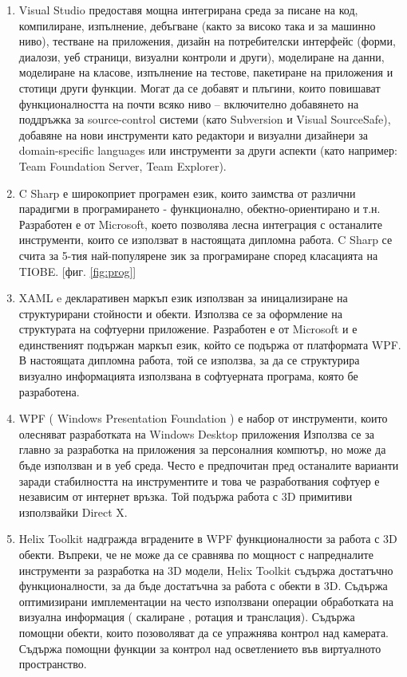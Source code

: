 \begin{enumerate}
    \item Visual Studio предоставя мощна интегрирана среда за писане на код, компилиране, изпълнение, дебъгване (както за високо така и за машинно ниво), тестване на приложения, дизайн на потребителски интерфейс (форми, диалози, уеб страници, визуални контроли и други), моделиране на данни, моделиране на класове, изпълнение на тестове, пакетиране на приложения и стотици други функции. Могат да се добавят и плъгини, които повишават функционалността на почти всяко ниво – включително добавянето на поддръжка за source-control системи (като Subversion и Visual SourceSafe), добавяне на нови инструменти като редактори и визуални дизайнери за domain-specific languages или инструменти за други аспекти (като например: Team Foundation Server, Team Explorer). \cite{vs}
    
    \item C Sharp е широкоприет програмен език, които заимства от различни парадигми в програмирането - функционално, обектно-ориентирано и т.н. Разработен е от Microsoft, което позволява лесна интеграция с останалите инструменти, които се използват в настоящата дипломна работа. C Sharp се счита за 5-тия най-популярене зик за програмиране според класацията на TIOBE. [фиг. \ref{fig:prog}]
    
    \item XAML e декларативен маркъп език използван за иницализиране на структурирани стойности и обекти. Използва се за оформление на структурата на софтуерни приложение. Разработен е от Microsoft и е единственият подържан маркъп език, който се подържа от платформата WPF. В настоящата дипломна работа, той се използва, за да се структурира визуално информацията използвана в софтуерната програма, която бе разработена.
    
    \item WPF ( Windows Presentation Foundation ) \cite{wpf} е набор от инструменти, които олесняват разработката на Windows Desktop приложения Използва се за главно за разработка на приложения за персоналния компютър, но може да бъде използван и в уеб среда. Често е предпочитан пред останалите варианти заради стабилността на инструментите и това че разработвания софтуер е независим от интернет връзка. Той подържа работа с 3D примитиви използвайки Direct X. \cite{wpfUsage}
    
    \item Helix Toolkit надгражда вградените в WPF функционалности за работа с 3D обекти. Въпреки, че не може да се сравнява по мощност с напредналите инструменти за разработка на 3D модели, Helix Toolkit съдържа достатъчно функционалности, за да бъде достатъчна за работа с обекти в 3D. Съдържа оптимизирани имплементации на често използвани операции обработката на визуална информация ( скалиране , ротация и транслация). Съдържа помощни обекти, които позоволяват да се упражнява контрол над камерата. Съдържа помощни функции за контрол над осветлението във виртуалното пространство. \cite{helix}
    

\end{enumerate}
